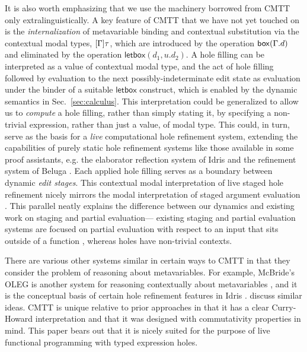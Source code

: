 It is also worth emphasizing that we use the machinery 
borrowed from CMTT only extralinguistically.
%
A key feature of CMTT that we have not yet touched on is the
\emph{internalization} of metavariable binding and contextual
substitution via the contextual modal types, $[\Gamma]\tau$, which
are introduced by the operation $\mathsf{box}(\Gamma.d)$ and
eliminated by the operation $\mathsf{letbox}(d_1, u.d_2)$.
%
A hole filling can be interpreted as a value of contextual modal
type, and the act of hole filling followed by evaluation to the next
possibly-indeterminate edit state as evaluation under the binder of a
suitable $\mathsf{letbox}$ construct, which is enabled by the dynamic
semantics in Sec.~\ref{sec:calculus}.
%
This interpretation could be generalized to allow us to \emph{compute} a hole filling, rather
than simply stating it, by specifying a non-trivial expression, rather than just a value, of
modal type.
%
This could, in turn, serve as the basis for a \emph{live} computational hole
refinement system, extending the capabilities of purely static hole
refinement systems like those available in some proof assistants,
e.g. the elaborator reflection system of Idris
\cite{brady2013idris,DBLP:conf/icfp/ChristiansenB16} and the refinement system of Beluga
\cite{DBLP:conf/flops/Pientka10,pientka2015inductive}.
%
Each applied hole filling serves as a boundary between dynamic
\emph{edit stages}.
%
This contextual modal interpretation of live staged hole refinement
nicely mirrors the modal interpretation of staged argument evaluation
\cite{Davies:2001op}. 
%
This parallel neatly explains
the difference between our dynamics and existing work on staging and
partial evaluation---
existing staging and partial evaluation systems are focused on partial evaluation with respect to an input that sits outside of a
function \cite{Jones:1993uq}, whereas holes have non-trivial contexts.

There are various other systems similar in certain ways to CMTT in 
that they consider the problem of reasoning about metavariables. 
For example, McBride's OLEG is another system for reasoning contextually about metavariables
\cite{DBLP:phd/ethos/McBride00}, and it is the conceptual basis of certain hole refinement features in Idris \cite{brady2013idris}. \citet{DBLP:conf/csl/GeuversJ02} discuss similar ideas. CMTT is unique relative to prior approaches in that it has a clear Curry-Howard interpretation and that it was designed with commutativity properties in mind. This paper bears out that it is nicely suited for the purpose of live functional programming with typed expression holes.


